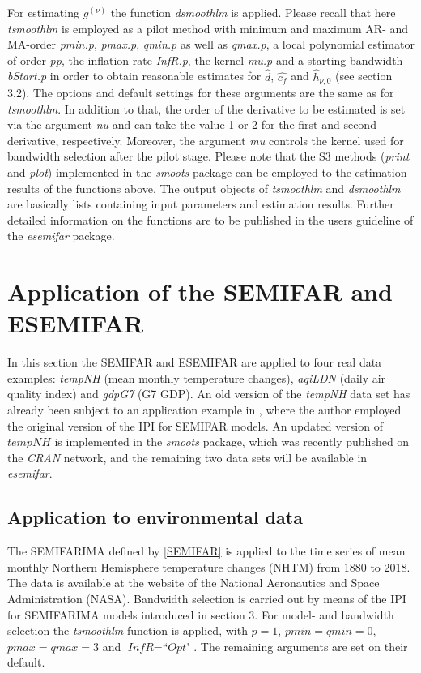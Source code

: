 \documentclass[12pt]{article}
\begin{document}
For estimating $g^{(\nu)}$ the function \textit{dsmoothlm} is applied. Please recall that here \textit{tsmoothlm} is employed as a pilot method with minimum and maximum AR- and MA-order \textit{pmin.p}, \textit{pmax.p}, \textit{qmin.p} as well as \textit{qmax.p}, a local polynomial estimator of order \textit{pp}, the inflation rate \textit{InfR.p}, the kernel \textit{mu.p} and a starting bandwidth \textit{bStart.p} in order to obtain reasonable estimates for $\hat{d}$, $\hat{c_f}$ and $\hat{h}_{\nu,0}$ (see section 3.2). The options and default settings for these arguments are the same as for \textit{tsmoothlm}. In addition to that, the order of the derivative to be estimated is set via the argument \textit{nu} and can take the value 1 or 2 for the first and second derivative, respectively. Moreover, the argument \textit{mu} controls the kernel used for bandwidth selection after the pilot stage. Please note that the S3 methods (\textit{print} and \textit{plot}) implemented in the \textit{smoots} package can be employed to the estimation results of the functions above. The output objects of \textit{tsmoothlm} and \textit{dsmoothlm} are basically lists containing input parameters and estimation results. Further detailed information on the functions are to be published in the users guideline of the \textit{esemifar} package.       


\section{Application of the SEMIFAR and ESEMIFAR}
In this section the SEMIFAR and ESEMIFAR are applied to four real data examples: \textit{tempNH} (mean monthly temperature changes), \textit{aqiLDN} (daily air quality index) and \textit{gdpG7} (G7 GDP). An old version of the \textit{tempNH} data set has already been subject to an application example in \citet{feng2007asymptotic}, where the author employed the original version of the IPI for SEMIFAR models. An updated version of $\textit{tempNH}$ is implemented in the \textit{smoots} package, which was recently published on the \textit{CRAN} network, and the remaining two data sets will be available in \textit{esemifar}. 

\subsection{Application to environmental data}
The SEMIFARIMA defined by \eqref{SEMIFAR} is applied to the time series of mean monthly Northern Hemisphere temperature changes (NHTM) from 1880 to 2018. The data is available at the website of the National Aeronautics and Space Administration (NASA). Bandwidth selection is carried out by means of the IPI for SEMIFARIMA models introduced in section 3. For model- and bandwidth selection the \textit{tsmoothlm} function is applied, with $\textit{p} = 1$, $\textit{pmin} = \textit{qmin} = 0$, $\textit{pmax} = \textit{qmax} = 3$ and $\textit{InfR} = \textit{``Opt"}$. The remaining arguments are set on their default. 
\end{document}
